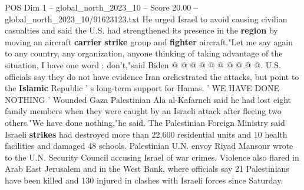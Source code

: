 \begin{textsample}{POS Dim 1 – global\_north\_2023\_10 – Score 20.00 – global\_north\_2023\_10/91623123.txt}
He urged Israel to avoid causing civilian casualties and said the U.S. had strengthened its presence in the \textbf{region} by moving an aircraft \textbf{carrier} \textbf{strike} group and \textbf{fighter} aircraft."Let me say again to any country, any organization, anyone thinking of taking advantage of the situation, I have one word : don't,"said Biden @ @ @ @ @ @ @ @ @ @.
U.S. officials say they do not have evidence Iran orchestrated the attacks, but point to the \textbf{Islamic} Republic ' s long-term support for Hamas. ' WE HAVE DONE NOTHING ' Wounded Gaza Palestinian Ala al-Kafarneh said he had lost eight family members when they were caught by an Israeli attack after fleeing two others."We have done nothing,"he said.
The Palestinian Foreign Ministry said Israeli \textbf{strikes} had destroyed more than 22,600 residential units and 10 health facilities and damaged 48 schools.
Palestinian U.N. envoy Riyad Mansour wrote to the U.N.
Security Council accusing Israel of war crimes.
Violence also flared in Arab East Jerusalem and in the West Bank, where officials say 21 Palestinians have been killed and 130 injured in clashes with Israeli forces since Saturday.

\end{textsample}
